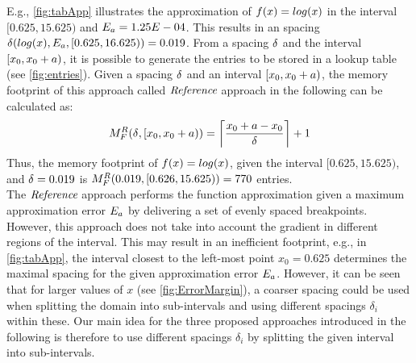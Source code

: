 E.g., \cref{fig:tabApp} illustrates the approximation of $f(x)=log(x)$ in the interval $[0.625,15.625)$ and $E_a=1.25E-04$.
This results in an spacing $\delta_{}(log(x),E_a,[0.625,16.625))=0.019$.
From a spacing $\delta_{}$ and the interval $[x_{0},x_{0}+a)$, it is possible to generate the entries to be stored in a lookup table (see \cref{fig:entries}).
Given a spacing $\delta_{}$  and an interval $[x_{0},x_{0}+a)$, the memory footprint of this approach called $\textit{Reference}$ approach in the following can be calculated as:
\begin{equation}
M_{F}^R(\delta_{},[x_{0},x_{0}+a)) = \bigg\lceil \dfrac{x_{0}+a-x_{0}}{\delta_{}} \bigg\rceil + 1
\label{eq:six}
\end{equation}
Thus, the memory footprint of $f(x)=log(x)$, given the interval $[0.625,15.625)$, and $\delta_{}=0.019$ is $M_{F}^R(0.019,[0.626,15.625)) = 770$ entries.\\
The $\textit{Reference}$ approach performs the function approximation given a maximum approximation error $E_a$ by delivering a set of evenly spaced breakpoints.
However, this approach does not take into account the gradient in different regions of the interval.
This may result in an inefficient footprint, e.g., in \cref{fig:tabApp}, the interval closest to the left-most point $x_0=0.625$ determines the maximal spacing for the given approximation error $E_a$.
However, it can be seen that for larger values of $x$ (see \cref{fig:ErrorMargin}), a coarser spacing could be used when splitting the domain into sub-intervals and using different spacings $\delta_i$ within these.
Our main idea for the three proposed approaches introduced in the following is therefore to use different spacings $\delta_i$ by splitting the given interval into sub-intervals.

